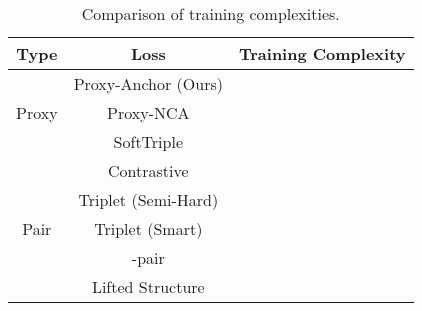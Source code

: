 \documentclass[10pt,twocolumn,letterpaper]{article}
\begin{document}
\begin{table}
\centering
\begin{tabularx}{\columnwidth} {c | c | c}
    \hline
    \multicolumn{1}{c|}{Type} & \multicolumn{1}{c|}{Loss} & \multicolumn{1}{c}{Training Complexity} \\ \hline 
\multirow{3}{*}{Proxy}
    &Proxy-Anchor (Ours) &  \\
    &Proxy-NCA \cite{movshovitz2017no} &  \\
&SoftTriple \cite{Qian_2019_ICCV} &  \\ \hline
    \multirow{5}{*}{Pair} 
    & Contrastive \cite{Bromley1994, Chopra2005, Hadsell2006} &  \\
    &Triplet (Semi-Hard) \cite{Schroff2015} &  \\
    &Triplet (Smart) \cite{Harwood_2017_ICCV} &  \\
    &-pair  \cite{Sohn_nips2016} &  \\
    &Lifted Structure \cite{songCVPR16} &  \\ \hline
\end{tabularx}
\vspace{1mm}
\caption{Comparison of training complexities.}
\label{tab:training_complexity}
\vspace{-2mm}
\end{table}





 
\end{document}

